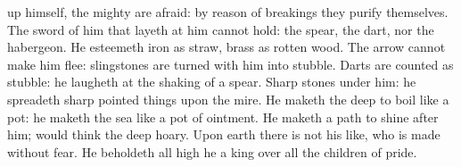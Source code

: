 {up himself, the
mighty are
afraid: by reason of
breakings they
purify themselves.
The
sword of him that
layeth at him cannot
hold: the
spear, the
dart, nor the
habergeon.
He
esteemeth
iron as
straw,
{}
brass as
rotten
wood.
The
arrow cannot make him
flee:
slingstones are
turned with him into
stubble.
Darts are
counted as
stubble: he
laugheth at the
shaking of a
spear.
Sharp
stones
{} under him: he
spreadeth sharp pointed
things upon the
mire.
He maketh the
deep to
boil like a
pot: he
maketh the
sea like a pot of
ointment.
He maketh a
path to
shine
after him;
{} would
think the
deep
{}
hoary.
Upon
earth there is not his
like, who is
made
without
fear.
He
beholdeth all
high
{} he
{} a
king over all the
children of
pride.

}

